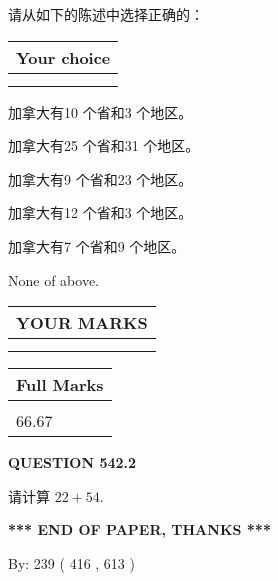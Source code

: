 \documentclass{ctexart}
\begin{document}
  
请从如下的陈述中选择正确的：
  
  
\noindent\hspace{3.0in} \begin{tabular}{|l|}
\hline
Your choice \\
\hline
 \\ 
 \\ 
\hline
\end{tabular}
  
  
 
 
加拿大有10 个省和3 个地区。
 
 
加拿大有25 个省和31 个地区。
 
 
加拿大有9 个省和23 个地区。
 
 
加拿大有12 个省和3 个地区。
 
 
加拿大有7 个省和9 个地区。
 
 
 None of above.
 
 
  
\vspace{0.2in}
  
\noindent\begin{tabular}{|l|}
\hline
 YOUR MARKS  \\
\hline
 \\ 
 \\ 
\hline
\end{tabular}
\hspace{0.05in} \begin{tabular}{|l|}
\hline
 Full Marks  \\
\hline
 \\ 
66.67 \\
\hline
\end{tabular}
{\textbf{\Large{QUESTION
542.2 
}}}
  
  
 
请计算 $ %
22 +  %
54 $.
 

 

 
   
   
 \vspace{0.2in}
 
   
   
   
   
\vspace{1.0in} 
{\textbf{\large{ *** END OF PAPER, THANKS *** }}} 
   
   
\hspace{1.0in} By: 
 239 ( 416 ,  613 )
   
\end{document}
